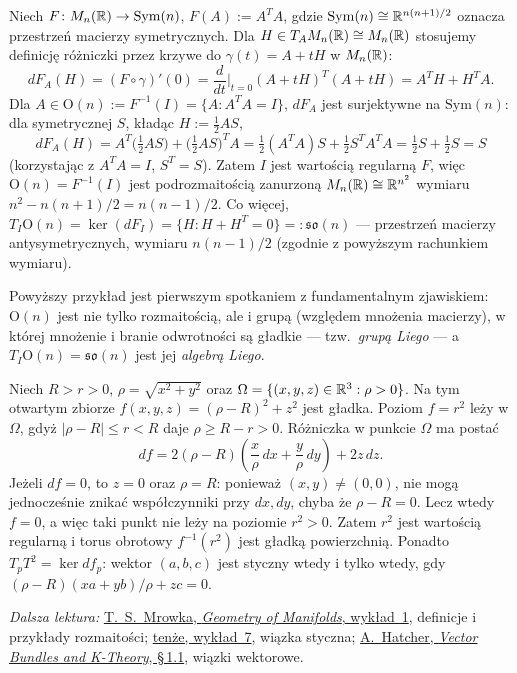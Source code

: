 \begin{przyklad}
Niech $F\colon M_n(\mathbb{R})\to\mathrm{Sym}(n)$, $F(A):=A^TA$, gdzie $\mathrm{Sym}(n)\cong
\mathbb{R}^{n(n+1)/2}$ oznacza przestrzeń macierzy symetrycznych. Dla $H\in T_AM_n(\mathbb{R})\cong M_n(\mathbb{R})$
stosujemy definicję różniczki przez krzywe do $\gamma(t)=A+tH$ w $M_n(\mathbb{R})$:
\[
dF_A(H)=(F\circ\gamma)'(0)=\frac{d}{dt}\Big|_{t=0}(A+tH)^T(A+tH)=A^TH+H^TA.
\]
Dla $A\in\mathrm{O}(n):=F^{-1}(I)=\{A:A^TA=I\}$, $dF_A$ jest surjektywne na
$\mathrm{Sym}(n)$: dla symetrycznej $S$, kładąc $H:=\tfrac12AS$,
\[
dF_A(H)=A^T\big(\tfrac12AS\big)+\big(\tfrac12AS\big)^TA=\tfrac12(A^TA)S+\tfrac12S^TA^TA=
\tfrac12S+\tfrac12S=S
\]
(korzystając z $A^TA=I$, $S^T=S$). Zatem $I$ jest wartością regularną $F$, więc
$\mathrm{O}(n)=F^{-1}(I)$ jest podrozmaitością zanurzoną $M_n(\mathbb{R})\cong\mathbb{R}^{n^2}$ wymiaru
$n^2-n(n+1)/2=n(n-1)/2$. Co więcej, $T_I\mathrm{O}(n)=\ker(dF_I)=\{H:H+H^T=0\}=:
\mathfrak{so}(n)$ — przestrzeń macierzy antysymetrycznych, wymiaru $n(n-1)/2$ (zgodnie z
powyższym rachunkiem wymiaru).
\end{przyklad}

\begin{uwaga}
Powyższy przykład jest pierwszym spotkaniem z fundamentalnym zjawiskiem: $\mathrm{O}(n)$
jest nie tylko rozmaitością, ale i grupą (względem mnożenia macierzy), w której mnożenie i
branie odwrotności są gładkie — tzw.\ \emph{grupą Liego} — a $T_I\mathrm{O}(n)=
\mathfrak{so}(n)$ jest jej \emph{algebrą Liego}.
\end{uwaga}

\begin{przyklad}
Niech $R>r>0$, $\rho=\sqrt{x^2+y^2}$ oraz
$\Omega=\{(x,y,z)\in\mathbb{R}^3:\rho>0\}$. Na tym otwartym zbiorze
$f(x,y,z)=(\rho-R)^2+z^2$ jest gładka. Poziom $f=r^2$
leży w $\Omega$, gdyż $|\rho-R|\leq r<R$ daje $\rho\geq R-r>0$.
Różniczka w punkcie $\Omega$ ma postać
\[
df=2(\rho-R)\left(\frac{x}{\rho}\,dx+
\frac{y}{\rho}\,dy\right)+2z\,dz.
\]
Jeżeli $df=0$, to $z=0$ oraz $\rho=R$: ponieważ $(x,y)\ne(0,0)$,
nie mogą jednocześnie znikać współczynniki przy $dx,dy$, chyba że
$\rho-R=0$. Lecz wtedy $f=0$, a więc taki punkt nie leży na
poziomie $r^2>0$. Zatem $r^2$ jest wartością regularną i torus
obrotowy $f^{-1}(r^2)$ jest gładką powierzchnią. Ponadto
$T_pT^2=\ker df_p$: wektor $(a,b,c)$ jest styczny wtedy i tylko
wtedy, gdy $(\rho-R)(xa+yb)/\rho+zc=0$.
\end{przyklad}

\par\smallskip
{\footnotesize\noindent\emph{Dalsza lektura:}
\href{https://www.ocw.mit.edu/courses/18-965-geometry-of-manifolds-fall-2004/34fad8f392208544e2b1e9794c33cbe7_lecture1.pdf}
{T.~S.~Mrowka, \emph{Geometry of Manifolds}, wykład~1},
definicje i przykłady rozmaitości;
\href{https://www.ocw.mit.edu/courses/18-965-geometry-of-manifolds-fall-2004/de18bf0029c583cacffb09810879bb54_lecture7.pdf}
{tenże, wykład~7}, wiązka styczna;
\href{https://pi.math.cornell.edu/~hatcher/VBKT/VB.pdf}
{A.~Hatcher, \emph{Vector Bundles and K-Theory}, \S\,1.1},
wiązki wektorowe.\par}

\clearpage
